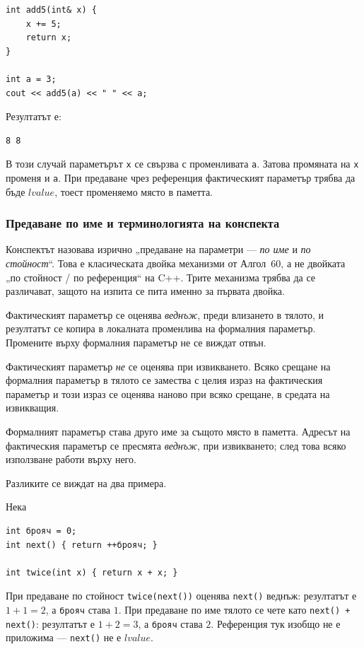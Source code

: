 \begin{verbatim}
int add5(int& x) {
    x += 5;
    return x;
}

int a = 3;
cout << add5(a) << " " << a;
\end{verbatim}

Резултатът е:

\begin{verbatim}
8 8
\end{verbatim}

В този случай параметърът \texttt{x} се свързва с променливата \texttt{a}. Затова промяната на \texttt{x} променя и \texttt{a}. При предаване чрез референция фактическият параметър трябва да бъде $lvalue$, тоест променяемо място в паметта.

\subsubsection{Предаване по име и терминологията на конспекта}

Конспектът назовава изрично „предаване на параметри --- \emph{по име} и
\emph{по стойност}“. Това е класическата двойка механизми от Алгол~60, а не
двойката „по стойност / по референция“ на C++. Трите механизма трябва да се
различават, защото на изпита се пита именно за първата двойка.

\begin{defn}
Фактическият параметър се оценява \emph{веднъж}, преди влизането в тялото, и
резултатът се копира в локалната променлива на формалния параметър. Промените
върху формалния параметър не се виждат отвън.
\end{defn}

\begin{defn}
Фактическият параметър \emph{не} се оценява при извикването. Всяко срещане на
формалния параметър в тялото се замества с целия израз на фактическия параметър
и този израз се оценява наново при всяко срещане, в средата на извикващия.
\end{defn}

\begin{defn}
Формалният параметър става друго име за същото място в паметта. Адресът на
фактическия параметър се пресмята \emph{веднъж}, при извикването; след това
всяко използване работи върху него.
\end{defn}

Разликите се виждат на два примера.

\begin{example}
Нека
\begin{verbatim}
int брояч = 0;
int next() { return ++брояч; }

int twice(int x) { return x + x; }
\end{verbatim}
При предаване по стойност \verb|twice(next())| оценява \verb|next()| веднъж:
резултатът е $1+1=2$, а \verb|брояч| става $1$. При предаване по име тялото се
чете като \verb|next() + next()|: резултатът е $1+2=3$, а \verb|брояч| става $2$.
Референция тук изобщо не е приложима --- \verb|next()| не е $lvalue$.
\end{example}

